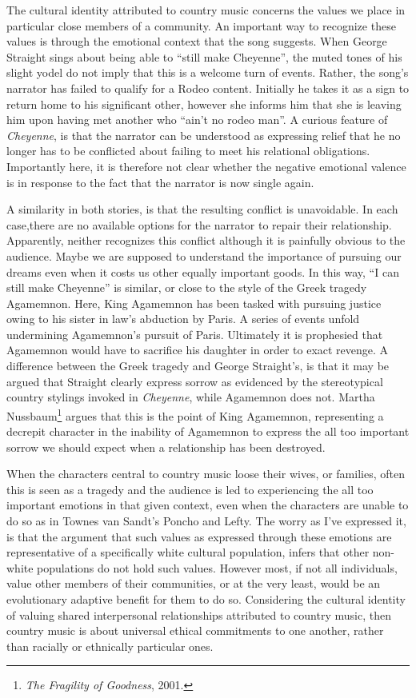 \documentclass[
  12pt,
]{book}
\theoremstyle{definition}
\theoremstyle{definition}
\theoremstyle{definition}
\theoremstyle{definition}
\theoremstyle{remark}
\begin{document}
The cultural identity attributed to country music concerns the values we place in particular close members of a community. An important way to recognize these values is through the emotional context that the song suggests. When George Straight sings about being able to ``still make Cheyenne'', the muted tones of his slight yodel do not imply that this is a welcome turn of events. Rather, the song's narrator has failed to qualify for a Rodeo content. Initially he takes it as a sign to return home to his significant other, however she informs him that she is leaving him upon having met another who ``ain't no rodeo man''. A curious feature of \emph{Cheyenne}, is that the narrator can be understood as expressing relief that he no longer has to be conflicted about failing to meet his relational obligations. Importantly here, it is therefore not clear whether the negative emotional valence is in response to the fact that the narrator is now single again.

A similarity in both stories, is that the resulting conflict is unavoidable. In each case,there are no available options for the narrator to repair their relationship. Apparently, neither recognizes this conflict although it is painfully obvious to the audience. Maybe we are supposed to understand the importance of pursuing our dreams even when it costs us other equally important goods. In this way, ``I can still make Cheyenne'' is similar, or close to the style of the Greek tragedy Agamemnon. Here, King Agamemnon has been tasked with pursuing justice owing to his sister in law's abduction by Paris. A series of events unfold undermining Agamemnon's pursuit of Paris. Ultimately it is prophesied that Agamemnon would have to sacrifice his daughter in order to exact revenge. A difference between the Greek tragedy and George Straight's, is that it may be argued that Straight clearly express sorrow as evidenced by the stereotypical country stylings invoked in \emph{Cheyenne}, while Agamemnon does not. Martha Nussbaum\footnote{\emph{The {Fragility} of {Goodness}}, 2001.} argues that this is the point of King Agamemnon, representing a decrepit character in the inability of Agamemnon to express the all too important sorrow we should expect when a relationship has been destroyed.

When the characters central to country music loose their wives, or families, often this is seen as a tragedy and the audience is led to experiencing the all too important emotions in that given context, even when the characters are unable to do so as in Townes van Sandt's Poncho and Lefty. The worry as I've expressed it, is that the argument that such values as expressed through these emotions are representative of a specifically white cultural population, infers that other non-white populations do not hold such values. However most, if not all individuals, value other members of their communities, or at the very least, would be an evolutionary adaptive benefit for them to do so. Considering the cultural identity of valuing shared interpersonal relationships attributed to country music, then country music is about universal ethical commitments to one another, rather than racially or ethnically particular ones.
\end{document}
